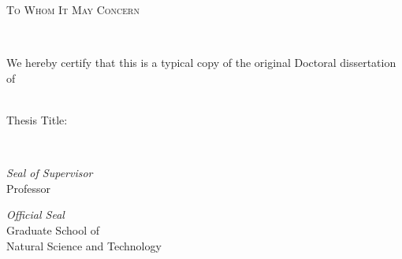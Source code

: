 \begin{center}
	
{\LARGE \scshape To Whom It May Concern  \par}\vspace{0.4cm} %
\HRule \\[1.5cm] %
	{\Large We hereby certify that this is a typical copy of the original Doctoral dissertation of \par}
	\vspace{1cm}
	 {\large \authorname} \\ \vspace{1cm}
	Thesis Title:\\ \vspace{0.5cm}
	 {\Large \ttitle}
	\vspace{3cm}
	
	\HRule \\[0.5cm]
\begin{minipage}[t]{0.4\textwidth}
	\begin{flushleft} \large
		\emph{Seal of Supervisor}  \\ 
		\vspace{3cm}
		\normalsize	{Professor \supname} %
	\end{flushleft}
\end{minipage}
\begin{minipage}[t]{0.5\textwidth}
	\begin{flushright} \large
		\emph{Official Seal} \\
			\vspace{3cm}
		\normalsize{Graduate School of \\
		Natural Science and Technology }\\
	\end{flushright}
\end{minipage}
\\[0.5cm]
\HRule \\[0.5cm]
\vfill
	
\end{center}